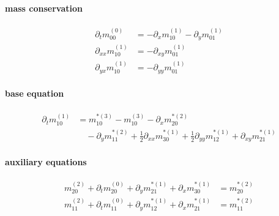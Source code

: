 \documentclass{article}
\begin{document}
  \paragraph{mass conservation}
  \begin{align}
    \partial_t m_{00}^{(0)}  & =  - \partial_x m_{10}^{(1)} - \partial_y m_{01}^{(1)}\tag{M1} \\
    \partial_{xx} m_{10}^{(1)}  & = - \partial_{xy} m_{01}^{(1)} \tag{M2}\\
    \partial_{yx} m_{10}^{(1)}  & = - \partial_{yy} m_{01}^{(1)} \tag{M3}
  \end{align}

  \paragraph{base equation}
  \begin{equation}
    \tag{B1}
    \begin{aligned}
       \partial_t m_{10}^{(1)} & =
      m_{10}^{*(3)} - m_{10}^{(3)} - \partial_x m_{20}^{*(2)} \\
      &\quad - \partial_y m_{11}^{*(2)} + \frac{1}{2}\partial_{xx} m_{30}^{*(1)} + \frac{1}{2} \partial_{yy} m_{12}^{*(1)} + \partial_{xy} m_{21}^{*(1)}
    \end{aligned}
  \end{equation}

  \paragraph{auxiliary equations}
  \begin{align}
    m_{20}^{(2)} + \partial_t m_{20}^{(0)} + \partial_y m_{21}^{*(1)} + \partial_x m_{30}^{*(1)} &= m_{20}^{*(2)} \tag{A1} \\
    m_{11}^{(2)} + \partial_t m_{11}^{(0)} + \partial_y m_{12}^{*(1)} + \partial_x m_{21}^{*(1)} &= m_{11}^{*(2)} \tag{A2}
  \end{align}
\end{document}
